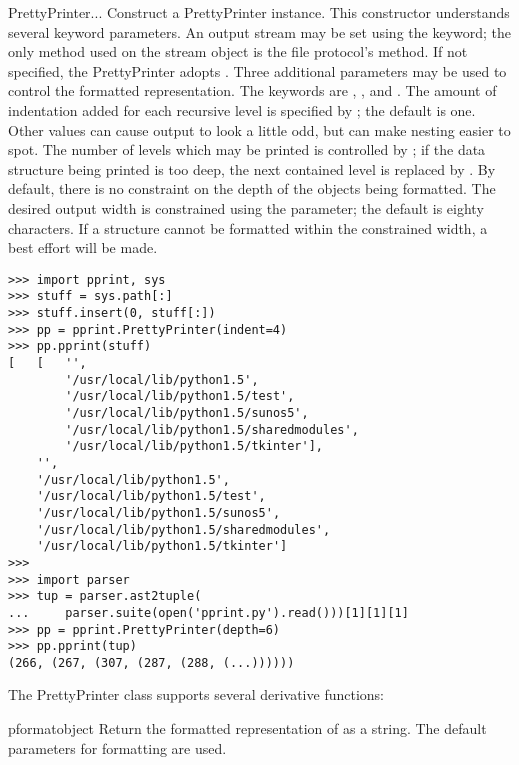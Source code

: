 \begin{funcdesc}{PrettyPrinter}{...}
Construct a PrettyPrinter instance.  This constructor understands
several keyword parameters.  An output stream may be set using the
 keyword; the only method used on the stream object is the
file protocol's  method.  If not specified, the
PrettyPrinter adopts .  Three additional parameters
may be used to control the formatted representation.  The keywords are
, , and .  The amount of indentation
added for each recursive level is specified by ; the
default is one.  Other values can cause output to look a little odd,
but can make nesting easier to spot.  The number of levels which may
be printed is controlled by ; if the data structure being
printed is too deep, the next contained level is replaced by
.  By default, there is no constraint on the depth of the
objects being formatted.  The desired output width is constrained
using the  parameter; the default is eighty characters.  If
a structure cannot be formatted within the constrained width, a best
effort will be made.

\begin{verbatim}
>>> import pprint, sys
>>> stuff = sys.path[:]
>>> stuff.insert(0, stuff[:])
>>> pp = pprint.PrettyPrinter(indent=4)
>>> pp.pprint(stuff)
[   [   '',
        '/usr/local/lib/python1.5',
        '/usr/local/lib/python1.5/test',
        '/usr/local/lib/python1.5/sunos5',
        '/usr/local/lib/python1.5/sharedmodules',
        '/usr/local/lib/python1.5/tkinter'],
    '',
    '/usr/local/lib/python1.5',
    '/usr/local/lib/python1.5/test',
    '/usr/local/lib/python1.5/sunos5',
    '/usr/local/lib/python1.5/sharedmodules',
    '/usr/local/lib/python1.5/tkinter']
>>>
>>> import parser
>>> tup = parser.ast2tuple(
...     parser.suite(open('pprint.py').read()))[1][1][1]
>>> pp = pprint.PrettyPrinter(depth=6)
>>> pp.pprint(tup)
(266, (267, (307, (287, (288, (...))))))
\end{verbatim}
\end{funcdesc}



The PrettyPrinter class supports several derivative functions:

\begin{funcdesc}{pformat}{object}
Return the formatted representation of  as a string.  The
default parameters for formatting are used.
\end{funcdesc}

